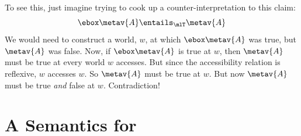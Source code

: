 To see this, just imagine trying to cook up a counter-interpretation to this claim:
\[
	\ebox \metav{A}\entails_\mlT \metav{A}
\]
We would need to construct a world, $w$, at which $\ebox \metav{A}$ was true, but $\metav{A}$ was false. Now, if $\ebox \metav{A}$ is true at $w$, then $\metav{A}$ must be true at every world $w$ accesses. But since the accessibility relation is reflexive, $w$ accesses $w$. So $\metav{A}$ must be true at $w$. But now $\metav{A}$ must be true \emph{and} false at $w$. Contradiction!

\section{A Semantics for \mlSfour}
\label{SemanticsS4}


